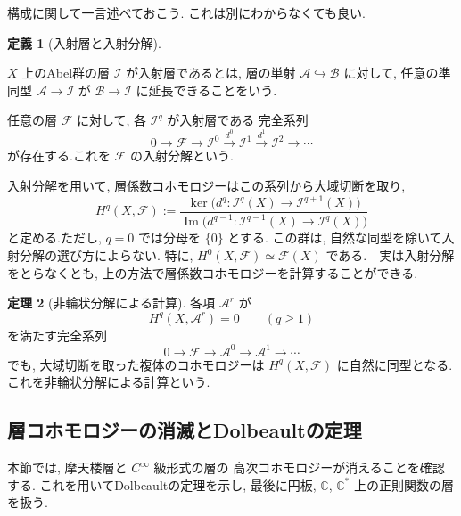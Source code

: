 \documentclass[dvipdfmx,a4paper,11pt]{article} %
\newcommand{\C}{\mathbb{C}}
\theoremstyle{definition}
\newtheorem{thm}{定理}[section]
\numberwithin{equation}{section}
\newtheorem{dfn}[thm]{定義}
\begin{document}
構成に関して一言述べておこう.
これは別にわからなくても良い. 
\begin{dfn}[入射層と入射分解]\label{dfn-injective-resolution}

$X$ 上のAbel群の層 $\mathcal I$ が入射層であるとは, 
層の単射 $\mathcal A\hookrightarrow\mathcal B$ に対して, 
任意の準同型 $\mathcal A\to\mathcal I$ が
$\mathcal B\to\mathcal I$ に延長できることをいう.

任意の層 $\mathcal F$ に対して, 各 $\mathcal I^q$ が入射層である
完全系列
\[
0\longrightarrow\mathcal F
\longrightarrow\mathcal I^0
\xrightarrow{d^0}\mathcal I^1
\xrightarrow{d^1}\mathcal I^2
\longrightarrow\cdots
\]
が存在する.これを $\mathcal F$ の入射分解という.
\end{dfn}

入射分解を用いて, 層係数コホモロジーはこの系列から大域切断を取り, 
\[
H^q(X,\mathcal F)
:=
\frac{
\ker\bigl(d^q:\mathcal I^q(X)\to\mathcal I^{q+1}(X)\bigr)
}{
\operatorname{Im}\bigl(d^{q-1}:\mathcal I^{q-1}(X)
\to\mathcal I^q(X)\bigr)
}
\]
と定める.ただし, $q=0$ では分母を $\{0\}$ とする.
この群は, 自然な同型を除いて入射分解の選び方によらない.
特に, 
\(
H^0(X,\mathcal F)\simeq\mathcal F(X)
\)
である.　実は入射分解をとらなくとも, 上の方法で層係数コホモロジーを計算することができる. 
\begin{thm}[非輪状分解による計算]\label{thm-acyclic-resolution}
各項 $\mathcal A^r$ が
\[
H^q(X,\mathcal A^r)=0\qquad(q\geq1)
\]
を満たす完全系列
\[
0\longrightarrow\mathcal F
\longrightarrow\mathcal A^0
\longrightarrow\mathcal A^1
\longrightarrow\cdots
\]
でも, 大域切断を取った複体のコホモロジーは
$H^q(X,\mathcal F)$ に自然に同型となる.
これを非輪状分解による計算という.
\end{thm}


\subsection{層コホモロジーの消滅とDolbeaultの定理}\label{O-S042}

本節では, 摩天楼層と $C^\infty$ 級形式の層の
高次コホモロジーが消えることを確認する.
これを用いてDolbeaultの定理を示し, 
最後に円板, $\C$, $\C^*$ 上の正則関数の層を扱う.
\end{document}
